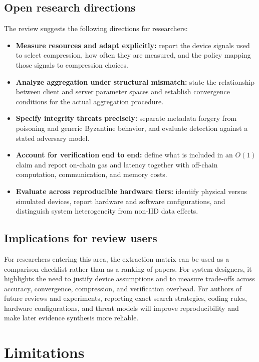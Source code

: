\documentclass[journal]{IEEEtran}
\begin{document}
\subsection{Open research directions}
\label{subsec:agenda}

The review suggests the following directions for researchers:
\begin{itemize}
  \item \textbf{Measure resources and adapt explicitly:} report the device signals used to select compression, how often they are measured, and the policy mapping those signals to compression choices.
  \item \textbf{Analyze aggregation under structural mismatch:} state the relationship between client and server parameter spaces and establish convergence conditions for the actual aggregation procedure.
  \item \textbf{Specify integrity threats precisely:} separate metadata forgery from poisoning and generic Byzantine behavior, and evaluate detection against a stated adversary model.
  \item \textbf{Account for verification end to end:} define what is included in an $O(1)$ claim and report on-chain gas and latency together with off-chain computation, communication, and memory costs.
  \item \textbf{Evaluate across reproducible hardware tiers:} identify physical versus simulated devices, report hardware and software configurations, and distinguish system heterogeneity from non-IID data effects.
\end{itemize}

\subsection{Implications for review users}
\label{subsec:implications}

For researchers entering this area, the extraction matrix can be used as a comparison checklist rather than as a ranking of papers. For system designers, it highlights the need to justify device assumptions and to measure trade-offs across accuracy, convergence, compression, and verification overhead. For authors of future reviews and experiments, reporting exact search strategies, coding rules, hardware configurations, and threat models will improve reproducibility and make later evidence synthesis more reliable.

\section{Limitations}
\label{sec:limitations}
\end{document}
